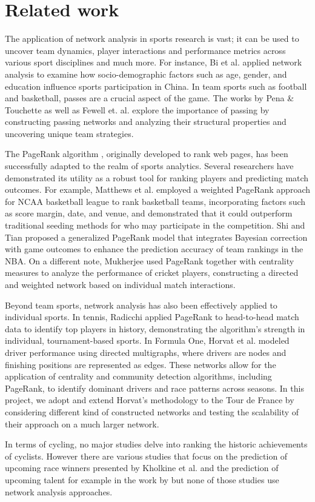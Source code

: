 \documentclass[9pt,twocolumn,twoside]{pnas-report}
\begin{document}
\section*{Related work}
The application of network analysis in sports research is vast; it can be used to uncover team dynamics, 
player interactions and performance metrics across various sport disciplines and much more.
For instance, Bi et al. \cite{Bi2024-me} applied network analysis to examine how socio-demographic factors such as age, gender, and education
influence sports participation in China.
In team sports such as football and basketball, passes are a crucial aspect of the game. 
The works by Pena \& Touchette \cite{Pena2012-sr} as well as Fewell et. al. \cite{Fewell2012-ha} explore the importance of passing by constructing
passing networks and analyzing their structural properties and uncovering unique team strategies. \par
The PageRank algorithm \cite{Page1999}, originally developed to rank web pages, has been successfully adapted to the realm of sports analytics. 
Several researchers have demonstrated its utility as a robust tool for ranking players and predicting match outcomes. 
For example, Matthews et al. \cite{Matthews2021-uu} employed a weighted PageRank approach for NCAA basketball league to rank basketball teams, incorporating factors such as score margin, 
date, and venue, and demonstrated that it could outperform traditional seeding methods for who may participate in the competition.
Shi and Tian \cite{Shi2020-wb} proposed a generalized PageRank model that integrates Bayesian correction with game outcomes to enhance the prediction accuracy of team rankings in the NBA.
On a different note, Mukherjee \cite{Mukherjee2012-zt} used PageRank together with centrality measures to analyze the performance of cricket players, constructing a directed and weighted network based on individual match interactions.
\par Beyond team sports, network analysis has also been effectively applied to individual sports.
In tennis, Radicchi \cite{Radicchi2011-nk} applied PageRank to head-to-head match data to identify top players in history,
demonstrating the algorithm's strength in individual, tournament-based sports.
In Formula One, Horvat et al. \cite{Horvat2023-fu} modeled driver performance using directed multigraphs, 
where drivers are nodes and finishing positions are represented as edges. 
These networks allow for the application of centrality and community detection algorithms, 
including PageRank, to identify dominant drivers and race patterns across seasons.
In this project, we adopt and extend Horvat's methodology to the Tour de France by considering different kind of constructed networks and 
testing the scalability of their approach on a much larger network. \par
In terms of cycling, no major studies delve into ranking the historic achievements of cyclists. However there are various studies
that focus on the prediction of upcoming race winners presented by Kholkine et al. \cite{Kholkine2021-ky} and the prediction of upcoming talent for example in the work by \cite{Janssens2023-ke}
but none of those studies use network analysis approaches.
\end{document}
